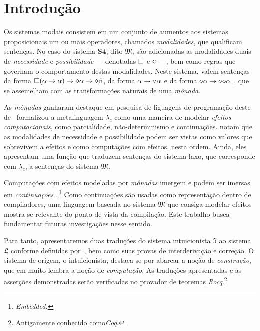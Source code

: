 \chapter{Introdução}

    Os sistemas modais consistem em um conjunto de aumentos aos sistemas proposicionais um ou mais operadores, chamados \emph{modalidades}, que qualificam sentenças.
    No caso do sistema $\mathbf{S4}$, dito $\mathfrak{M}$, são adicionadas as modalidades duais de \emph{necessidade} e \emph{possibilidade} --- denotadas $\Box$ e $\pos$ ---, bem como regras que governam o comportamento destas modalidades.
    Neste sistema, valem sentenças da forma $\nec(\alpha\to\alpha)\to\pos\alpha\to\pos\beta$, da forma $\alpha\to\pos\alpha$ e da forma $\pos\alpha\to\pos\pos\alpha$ \citep{Zach+others.2024}, que se assemelham com as transformações naturais de uma \emph{mônada}.

    \vspace{.5\baselineskip}
    As \emph{mônadas} ganharam destaque em pesquisa de liguagens de programação deste de~\cite{Moggi.1991} formalizou a metalinguagem $\lambda_c$ como uma maneira de modelar \emph{efeitos computacionais}, como parcialidade, não-determinismo e continuações.
    \cite{Pfenning+Davies.2001} notam que as modalidades de necessidade e possibilidade podem ser vistas como valores que sobrevivem a efeitos e como computações com efeitos, nesta ordem.
    Ainda, eles apresentam uma função que traduzem sentenças do sistema laxo, que corresponde com $\lambda_c$, a sentenças do sistema $\mathfrak{M}$.

    \vspace{.5\baselineskip}
    Computações com efeitos modeladas por \emph{mônadas} imergem e podem ser imersas em \emph{continuações}~\citep{Filinski.1994}.\footnote{\emph{Embedded.}}
    Como continuações são usadas como representação dentro de compiladores, uma linguagem baseada no sistema $\mathfrak{M}$ que consiga modelar efeitos mostra-se relevante do ponto de vista da compilação.
    Este trabalho busca fundamentar futuras investigações nesse sentido.

    \vspace{.5\baselineskip}
    Para tanto, apresentaremos duas traduções do sistema intuicionista $\mathfrak{I}$ ao sistema $\mathfrak{L}$ conforme definidas por~\cite{Troelstra+Schwichtenberg.2000}, bem como suas provas de interderivação e correção.
    O sistema de origem, o intuicionista, destaca-se por abarcar a noção de \emph{construção}, que em muito lembra a noção de \emph{computação}.
    As traduções apresentadas e as asserções demonstradas serão verificadas no provador de teoremas \emph{Rocq}.\footnote{Antigamente conhecido como\emph{Coq}.}

